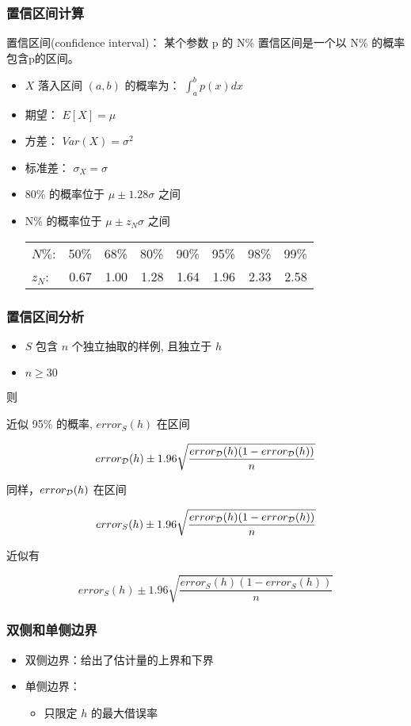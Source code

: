 \documentclass{beamer}
\begin{document}
\begin{frame}
\frametitle{置信区间计算}
\label{sec-3-4}

置信区间(confidence interval)： 某个参数 p 的 N\% 置信区间是一个以 N\% 的概率包含p的区间。

\begin{itemize}
\item $X$ 落入区间 $(a,b)$ 的概率为：  $\int_{a}^{b} p(x) dx$
\item 期望： $E[X] = \mu$
\item 方差： $Var(X) = \sigma^{2}$
\item 标准差： $\sigma_{X} = \sigma$
\item 80\% 的概率位于 $\mu \pm 1.28 \sigma$ 之间
\item N\% 的概率位于 $\mu \pm z_{N} \sigma$ 之间

\begin{center}
\begin{tabular}{lrrrrrrr}
 $N\%$:    &  50\%  &  68\%  &  80\%  &  90\%  &  95\%  &  98\%  &  99\%  \\
 $z_{N}$:  &  0.67  &  1.00  &  1.28  &  1.64  &  1.96  &  2.33  &  2.58  \\
\end{tabular}
\end{center}


\end{itemize}
\end{frame}
\begin{frame}
\frametitle{置信区间分析}
\label{sec-3-5}

\begin{itemize}
\item $S$ 包含 $n$ 个独立抽取的样例, 且独立于 $h$
\item $n \geq 30$
\end{itemize}

则

近似 95\% 的概率, $error_{S}(h)$ 在区间

$$error_{\cal{D}}(h) \pm 1.96 \sqrt{\frac{error_{\cal{D}}(h) (1 - error_{\cal{D}}(h))}{n}}$$

同样，$error_{\cal{D}}(h)$ 在区间

\[ error_{S}(h) \pm 1.96 \sqrt{\frac{error_{\cal{D}}(h) (1 - error_{\cal{D}}(h))}{n}} \]

近似有

\[ error_{S}(h) \pm 1.96 \sqrt{\frac{error_{S}(h) (1 - error_{S}(h))}{n}} \]
\end{frame}
\begin{frame}
\frametitle{双侧和单侧边界}
\label{sec-3-6}

\begin{itemize}
\item 双侧边界：给出了估计量的上界和下界
\item 单侧边界：
\begin{itemize}
\item 只限定 $h$  的最大借误率
\end{itemize}
\end{itemize}
\end{frame}
\end{document}
